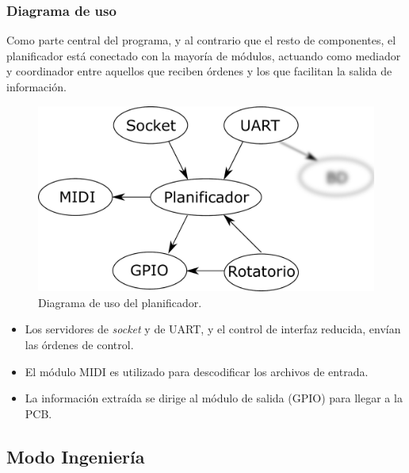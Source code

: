 \smallskip

\subsubsection{Diagrama de uso}

Como parte central del programa, y al contrario que el resto de componentes, el planificador está conectado con la mayoría de módulos, actuando como mediador y coordinador entre aquellos que reciben órdenes y los que facilitan la salida de información.

\smallskip

\begin{figure}[H]
	\noindent \begin{centering}
		\includegraphics[width=\linewidth/2]{capitulo4/daemon_scheduler}
		\par\end{centering}
	\smallskip
	\caption{\label{fig:daemon_scheduler} Diagrama de uso del planificador.}
\end{figure} 

\smallskip

\begin{itemize}
	\item Los servidores de \textit{socket} y de \acrshort{UART}, y el control de interfaz reducida, envían las órdenes de control.
	\item El módulo \acrshort{MIDI} es utilizado para descodificar los archivos de entrada.
	\item La información extraída se dirige al módulo de salida (\acrshort{GPIO}) para llegar a la \acrshort{PCB}.
\end{itemize}

\subsection{Modo Ingeniería}
\label{subsec:ingenieria}

